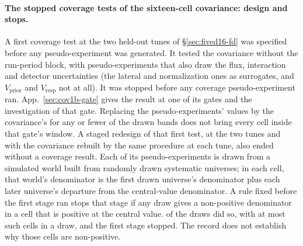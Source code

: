 \paragraph{The stopped coverage tests of the sixteen-cell covariance: design and stops.} A first coverage test at the two held-out tunes of \S\ref{sec:fived16-fd} was specified before any pseudo-experiment was generated. It tested the covariance without the run-period block, with pseudo-experiments that also draw the flux, interaction and detector uncertainties (the lateral and normalization ones as surrogates, and $V_{\mathrm{prior}}$ and $V_{\mathrm{resp}}$ not at all). It was stopped before any coverage pseudo-experiment ran. App.~\ref{sec:cov1b-gate} gives the result at one of its gates and the investigation of that gate. Replacing the pseudo-experiments' values by the covariance's for any  or fewer of the  drawn bands does not bring every cell inside that gate's window. A staged redesign of that first test, at the two tunes and with the covariance rebuilt by the same procedure at each tune, also ended without a coverage result. Each of its pseudo-experiments is drawn from a simulated world built from randomly drawn systematic universes; in each cell, that world's denominator is the first drawn universe's denominator plus each later universe's departure from the central-value denominator. A rule fixed before the first stage ran stops that stage if any draw gives a non-positive denominator in a cell that is positive at the central value.  of the  draws did so, with at most  such cells in a draw, and the first stage stopped. The record does not establish why those cells are non-positive.

